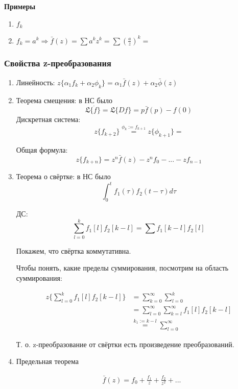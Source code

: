 \documentclass[main.tex]{subfiles}
\begin{document}
\textbf{ Примеры }

\begin{enumerate}[noitemsep]
	\item $ f_k $ %
	\item $ f_k = a^k \Rightarrow \bar f(z) = \sum a^k z^k  = \sum \left( \frac{ a }{ z } \right)^k =  $%
\end{enumerate}

\subsubsection{ Свойства z-преобразования }

\begin{enumerate}[noitemsep]
	\item Линейность: $ z \{ \alpha_1 f_k + \alpha_2 \phi_k \} = \alpha_1 \bar f(z) + \alpha_2 \bar \phi(z) $
	\item Теорема смещения: в НС было
	\[ \mathfrak{L} \{ \dot f \} = \mathfrak{L} \{ D f \} = p \bar f(p) - f(0) \]
	Дискретная система:
	\[ z\{ f_{k+2} \} \overset{\phi_k := f_{k+1}}= z\{ \phi_{k+1} \} = \] %
	
	Общая формула:
	\[ z\{ f_{k+n} \} = z^n \bar f(z) - z^n f_0 - ... - z f_{n-1} \]
	
	\item Теорема о свёртке: в НС было
	\[ \int_{0}^t f_1(\tau) f_2(t - \tau) d \tau \]
	
	ДС:
	\[ \sum_{l=0}^k f_1[l] f_2[k-l] = \sum f_1 [k-l] f_2 [l] \]
	
	Покажем, что свёртка коммутативна.
	
	Чтобы понять, какие пределы суммирования, посмотрим на область суммирования:
	
	\begin{align*}
		z\{ \sum_{l=0}^k f_1[l] f_2[k-l] \} & = \sum_{k=0}^\infty \sum_{l=0}^k \\ %
		& = \sum_{l=0}^{\infty} \sum_{k=l}^{\infty} f_1[l] f_2[k-l] \\ %
		& \overset{k_1 := k-l}= \sum_{l=0}^{\infty}
	\end{align*}
	
	Т. о. z-преобразование от свёртки есть произведение преобразований.
	
	\item Предельная теорема
	
	\begin{align*}
		& \bar f(z) = f_0 + \frac{f_1}{z} + \frac{f_2}{z^2} + ... \\
		& \\ %
	\end{align*}
	

\end{enumerate}
\end{document}
